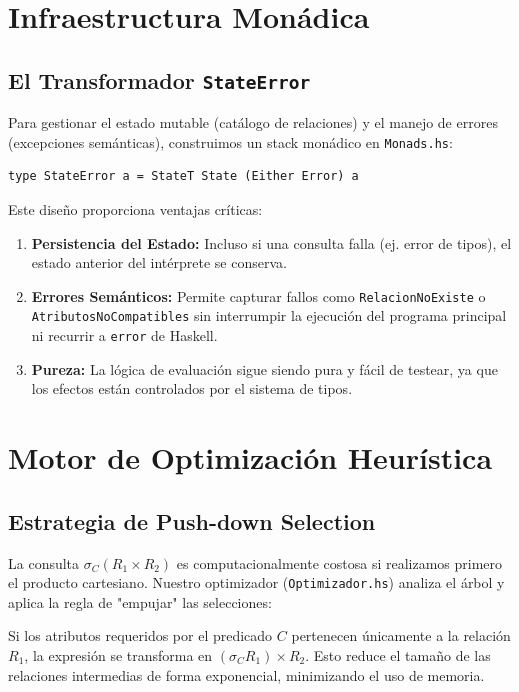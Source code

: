 \documentclass[12pt]{report}
\begin{document}
\chapter{Infraestructura Monádica}

\section{El Transformador \texttt{StateError}}
Para gestionar el estado mutable (catálogo de relaciones) y el manejo de errores (excepciones semánticas), construimos un stack monádico en \texttt{Monads.hs}:

\begin{lstlisting}
type StateError a = StateT State (Either Error) a
\end{lstlisting}

Este diseño proporciona ventajas críticas:
\begin{enumerate}
    \item \textbf{Persistencia del Estado:} Incluso si una consulta falla (ej. error de tipos), el estado anterior del intérprete se conserva.
    \item \textbf{Errores Semánticos:} Permite capturar fallos como \texttt{RelacionNoExiste} o \texttt{AtributosNoCompatibles} sin interrumpir la ejecución del programa principal ni recurrir a \texttt{error} de Haskell.
    \item \textbf{Pureza:} La lógica de evaluación sigue siendo pura y fácil de testear, ya que los efectos están controlados por el sistema de tipos.
\end{enumerate}

\chapter{Motor de Optimización Heurística}

\section{Estrategia de Push-down Selection}
La consulta $\sigma_{C}(R_1 \times R_2)$ es computacionalmente costosa si realizamos primero el producto cartesiano. Nuestro optimizador (\texttt{Optimizador.hs}) analiza el árbol y aplica la regla de "empujar" las selecciones:

Si los atributos requeridos por el predicado $C$ pertenecen únicamente a la relación $R_1$, la expresión se transforma en $(\sigma_{C} R_1) \times R_2$. Esto reduce el tamaño de las relaciones intermedias de forma exponencial, minimizando el uso de memoria.
\end{document}
